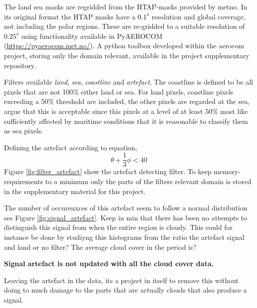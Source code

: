 The land sea masks are regridded from the HTAP-masks provided by \acrfull{metno}.  In its original format the HTAP masks have a $0.1^o$ resolution and global coverage, not including the polar regions. These are re-gridded to a suitable resolution of $0.25^o$ using functionality available in PyAEROCOM (\href{https://pyaerocom.met.no/}{https://pyaerocom.met.no/}). A python toolbox developed within the \acrfull{aerocom} project, storing only the domain relevant, available in the project supplementary repository. 

Filters available \textit{land}, \textit{sea}, \textit{coastline} and \textit{artefact}. The coastline is defined to be all pixels that are not 100\% either land or sea. For land pixels, coastline pixels exceeding a 50\% threshold are included, the other pixels are regarded at the sea, argue that this is acceptable since this pixels at a level of at least 50\% most like sufficiently affected by maritime conditions that it is reasonable to classify them as sea pixels.

Defining the artefact according to equation, 
\begin{equation} \label{eq:artefact}
    \theta + \frac{1}{3}\phi < 40
\end{equation}
Figure \ref{fig:filter_artefact} show the artefact detecting filter. To keep memory-requirements to a minimum only the parts of the filters relevant domain is stored in the supplementary material for this project.

The number of occurenxces of this artefact seem to follow a normal distribution see Figure \ref{fig:signal_artefact}. Keep in min that there has been no attempts to distinguish this signal from when the entire region is cloudy. This could for instance be done by studiyng thie histograms from the ratio the artefact signal and land or no filter? The average cloud cover in the period is? 

\textbf{Signal artefact is not updated with all the cloud cover data.}

Leaving the artefact in the data, its a project in itself to remove this without doing to much damage to the parts that are actually clouds that also produce a signal.

